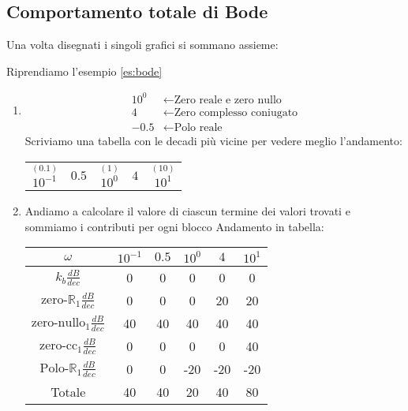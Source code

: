 \documentclass[a4paper]{article}
\begin{document}
\subsection{Comportamento totale di Bode}
Una volta disegnati i singoli grafici si sommano assieme:
\begin{example}
  Riprendiamo l'esempio \ref{es:bode}
  \begin{enumerate}
    \item 
      \[
        \begin{aligned}
          10^0 & \leftarrow \text{Zero reale e zero nullo}\\
          4 & \leftarrow \text{Zero complesso coniugato}\\
          -0.5 & \leftarrow \text{Polo reale}
        \end{aligned}
      \] 
      Scriviamo una tabella con le decadi più vicine per vedere meglio l'andamento:
      \begin{table}[H]
        \centering
        \begin{tabular}{c|c|c|c|c}
          $\stackrel{(0.1)}{10^{-1}}$ & $0.5$ & $\stackrel{(1)}{10^{0}}$ & $4$ & $\stackrel{(10)}{10^{1}}$\\
        \end{tabular}
      \end{table}

    \item Andiamo a calcolare il valore di ciascun termine dei valori trovati e sommiamo i contributi per ogni blocco
      \label{16-12-D1}
      \noindent
      Andamento in tabella:
      \begin{table}[H]
        \centering
        \begin{tabular}{c|c|c|c|c|c}
          $\omega$ & $10^{-1}$ & $0.5$ & $10^{0}$ & $4$ & $10^{1}$\\
          \hline
          \color{blue} \( k_b \frac{dB}{dec} \) & \color{blue}0 & \color{blue}0 & \color{blue}0 & \color{blue}0 & \color{blue}0 \\
          \color{red} \( \text{zero-}\mathbb{R}_1 \frac{dB}{dec}\) & \color{red}0 & \color{red}0 & \color{red}0 & \color{red}20 & \color{red}20 \\ 
          \color{green!50!black} \( \text{zero-nullo}_1 \frac{dB}{dec}\) & \color{green!50!black}40 & \color{green!50!black}40 & \color{green!50!black}40 & \color{green!50!black}40 & \color{green!50!black}40 \\ 
          \color{purple} \( \text{zero-cc}_1 \frac{dB}{dec}\) & \color{purple}0 & \color{purple}0 & \color{purple}0 & \color{purple}0 & \color{purple}40 \\ 
          \color{orange} \( \text{Polo-}\mathbb{R}_1 \frac{dB}{dec}\) & \color{orange}0 & \color{orange}0 & \color{orange}-20 & \color{orange}-20 & \color{orange}-20 \\ 
          \hline
          Totale & 40 & 40 & 20 & 40 & 80
        \end{tabular}
      \end{table}


\end{enumerate}
\end{example}
\end{document}
